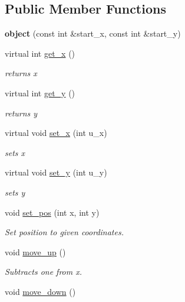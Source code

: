\subsection*{Public Member Functions}
\begin{DoxyCompactItemize}
\item 
\mbox{\label{classobject_a3266e9f8d8e98fe05314c959f5929c7d}} 
{\bfseries object} (const int \&start\+\_\+x, const int \&start\+\_\+y)
\item 
virtual int \hyperlink{classobject_a495a093671c8741380a292dd0bc757cb}{get\+\_\+x} ()
\begin{DoxyCompactList}\small\item\em returns x \end{DoxyCompactList}\item 
virtual int \hyperlink{classobject_abc363fe3aa7a4f29b035df6a57695eba}{get\+\_\+y} ()
\begin{DoxyCompactList}\small\item\em returns y \end{DoxyCompactList}\item 
virtual void \hyperlink{classobject_a0520ed913c351f67b3abc458a5896833}{set\+\_\+x} (int u\+\_\+x)
\begin{DoxyCompactList}\small\item\em sets x \end{DoxyCompactList}\item 
virtual void \hyperlink{classobject_af2831ab422aedd6671aa894d78bb5288}{set\+\_\+y} (int u\+\_\+y)
\begin{DoxyCompactList}\small\item\em sets y \end{DoxyCompactList}\item 
void \hyperlink{classobject_a303b713cf517cebb6b56476facc9022f}{set\+\_\+pos} (int x, int y)
\begin{DoxyCompactList}\small\item\em Set position to given coordinates. \end{DoxyCompactList}\item 
void \hyperlink{classobject_afeb4c581ea86494f8063f286664adbe6}{move\+\_\+up} ()
\begin{DoxyCompactList}\small\item\em Subtracts one from x. \end{DoxyCompactList}\item 
void \hyperlink{classobject_a0a8f714e2850552b925383f53c407430}{move\+\_\+down} ()

\end{DoxyCompactItemize}
